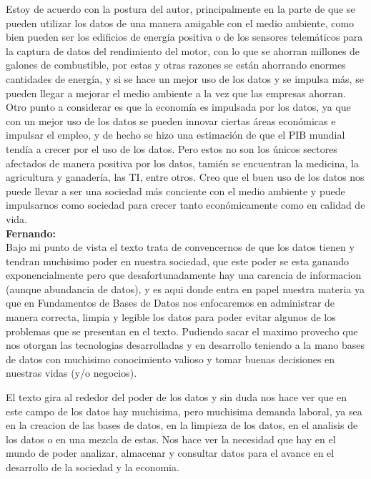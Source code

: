 \documentclass[12pt,a4paper]{article}
\begin{document}
\begin{enumerate}
\begin{enumerate}
				Estoy de acuerdo con la postura del autor, principalmente en la parte de que 
				se pueden utilizar los datos de una manera amigable con el medio ambiente, 
				como bien pueden ser los edificios de energía positiva o de los sensores 
				telemáticos para la captura de datos del rendimiento del motor, con lo que se 
				ahorran millones de galones de combustible, por estas y otras razones se están 
				ahorrando enormes cantidades de energía, y si se hace un mejor uso de los datos 
				y se impulsa más, se pueden llegar a mejorar el medio ambiente a la vez que las 
				empresas ahorran. Otro punto a considerar es que la economía es impulsada por los 
				datos, ya que con un mejor uso de los datos se pueden innovar ciertas áreas 
				económicas e impulsar el empleo, y de hecho se hizo una estimación de que el 
				PIB mundial tendía a crecer por el uso de los datos.
				Pero estos no son los únicos sectores afectados de manera positiva por los datos, 
				tamién se encuentran la medicina, la agricultura y ganadería, las TI, entre otros.
				Creo que el buen uso de los datos nos puede llevar a ser una sociedad más conciente
				con el medio ambiente y puede impulsarnos como sociedad para crecer tanto económicamente 
				como en calidad de vida.\\

				\textbf{Fernando:}\\
				Bajo mi punto de vista el texto trata de convencernos de que los datos tienen y tendran muchisimo poder en nuestra 
				sociedad, que este poder se esta ganando exponencialmente pero que desafortunadamente hay una carencia de informacion 
				(aunque abundancia de datos), y es aqui donde entra en papel nuestra materia ya que en Fundamentos de Bases de Datos nos
				enfocaremos en administrar de manera correcta, limpia y legible los datos para poder evitar algunos de los problemas que
				se presentan en el texto. Pudiendo sacar el maximo provecho que nos otorgan las tecnologias desarrolladas y en desarrollo 
				teniendo a la mano bases de datos con muchisimo conocimiento valioso y tomar buenas decisiones en nuestras vidas (y/o 
				negocios).

				El texto gira al rededor del poder de los datos y sin duda nos hace ver que en este campo de los datos hay muchisima,
				pero muchisima demanda laboral, ya sea en la creacion de las bases de datos, en la limpieza de los datos, en el analisis 
				de los datos o en una mezcla de estas. Nos hace ver la necesidad que hay en el mundo de poder analizar, almacenar y 
				consultar datos para el avance en el desarrollo de la sociedad y la economia.


\end{enumerate}
\end{enumerate}
\end{document}
